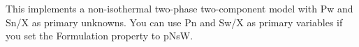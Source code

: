 This implements a non-isothermal two-phase two-component model with Pw and Sn/X as primary unknowns. You can use Pn and Sw/X as primary variables if you set the Formulation property to pNsW. 
